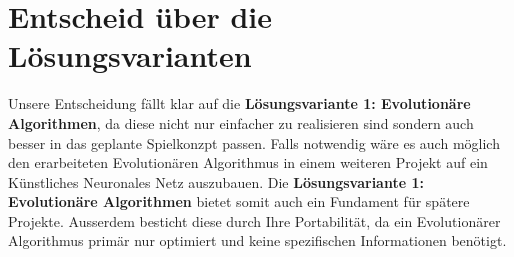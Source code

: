 \section{Entscheid über die Lösungsvarianten}
Unsere Entscheidung fällt klar auf die \textbf{Lösungsvariante 1: Evolutionäre Algorithmen}, da diese nicht nur einfacher zu realisieren sind sondern auch besser in das geplante Spielkonzpt passen. Falls notwendig wäre es auch möglich den erarbeiteten Evolutionären Algorithmus in einem weiteren Projekt auf ein Künstliches Neuronales Netz auszubauen. Die \textbf{Lösungsvariante 1: Evolutionäre Algorithmen} bietet somit auch ein Fundament für spätere Projekte. Ausserdem besticht diese durch Ihre Portabilität, da ein Evolutionärer Algorithmus primär nur optimiert und keine spezifischen Informationen benötigt.